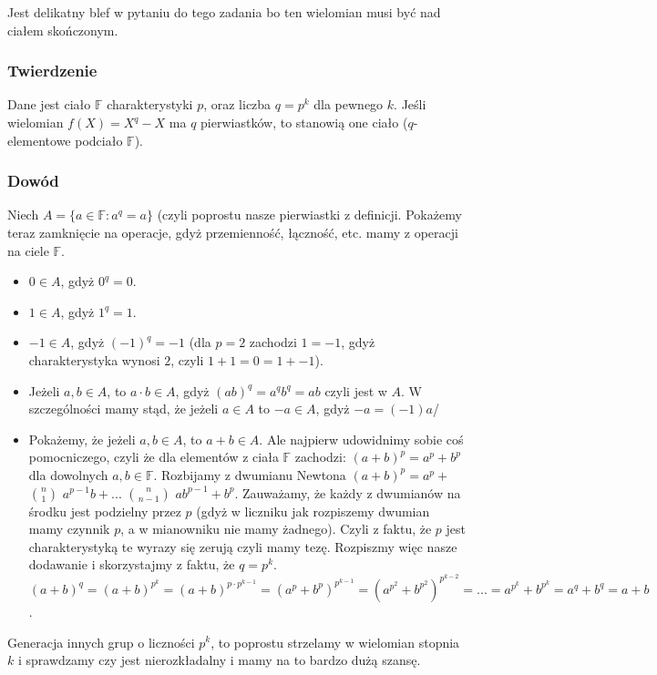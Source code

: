 Jest delikatny blef w pytaniu do tego zadania bo ten wielomian musi być nad ciałem skończonym.
\subsubsection{Twierdzenie}
Dane jest ciało $\mathbb{F}$ charakterystyki $p$, oraz liczba $q = p^k$ dla pewnego $k$. Jeśli wielomian $f(X) = X^q - X$ ma $q$ pierwiastków, to stanowią
one ciało ($q$-elementowe podciało $\mathbb{F}$).
\subsubsection{Dowód}
Niech $A = \{a \in \mathbb{F}: a^q = a\}$ (czyli poprostu nasze pierwiastki z definicji. Pokażemy teraz zamknięcie na operacje, gdyż przemienność, łączność, etc. mamy z operacji na ciele $\mathbb{F}$.
\begin{itemize}
    \item $0 \in A$, gdyż $0^q = 0$.
    \item $1 \in A$, gdyż $1^q = 1$.
    \item $-1 \in A$, gdyż $(-1)^q = -1$ (dla $p = 2$ zachodzi $1 = -1$, gdyż charakterystyka wynosi $2$, czyli $1 + 1 = 0 = 1 + -1$).
    \item Jeżeli $a,b \in A$, to $a\cdot b \in A$, gdyż $(ab)^q = a^qb^q = ab$ czyli jest w $A$. W szczególności mamy stąd, że jeżeli $a \in A$ to $-a \in A$, gdyż $-a = (-1)a$/
    \item Pokażemy, że jeżeli $a,b \in A$, to $a + b \in A$. Ale najpierw udowidnimy sobie coś pomocniczego, czyli że dla elementów z ciała $\mathbb{F}$ zachodzi: $(a+b)^p = a^p +b^p$ dla dowolnych $a,b \in \mathbb{F}$. Rozbijamy z dwumianu Newtona $(a+b)^p = a^p + $ $n \choose 1$ $a^{p-1}b + ... $ $n \choose n-1$ $ab^{p-1} + b^p$. Zauważamy, że każdy z dwumianów na środku jest podzielny przez $p$ (gdyż w liczniku jak rozpiszemy dwumian mamy czynnik $p$, a w mianowniku nie mamy żadnego). Czyli z faktu, że $p$ jest charakterystyką te wyrazy się zerują czyli mamy tezę. Rozpiszmy więc nasze dodawanie i skorzystajmy z faktu, że $q = p^k$. $(a+b)^q = (a+b)^{p^k} = (a+b)^{p\cdot p^{k-1}} = (a^p + b^p)^{p^{k-1}} = (a^{p^2} + b^{p^2})^{p^{k-2}} = ... = a^{p^k} + b^{p^k} = a^q + b^q = a + b$.

\end{itemize}
Generacja innych grup o liczności $p^k$, to poprostu strzelamy w wielomian stopnia $k$ i sprawdzamy czy jest nierozkładalny i mamy na to bardzo dużą szansę.